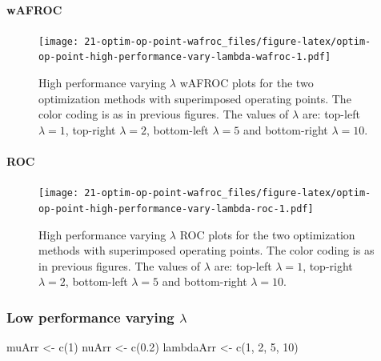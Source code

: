 \documentclass[
]{book}
\newenvironment{Shaded}{\begin{snugshade}}{\end{snugshade}}
\newcommand{\DecValTok}[1]{\textcolor[rgb]{0.00,0.00,0.81}{#1}}
\newcommand{\FloatTok}[1]{\textcolor[rgb]{0.00,0.00,0.81}{#1}}
\newcommand{\FunctionTok}[1]{\textcolor[rgb]{0.00,0.00,0.00}{#1}}
\newcommand{\NormalTok}[1]{#1}
\newcommand{\OtherTok}[1]{\textcolor[rgb]{0.56,0.35,0.01}{#1}}
\begin{document}
\hypertarget{wafroc-7}{%
\paragraph{wAFROC}\label{wafroc-7}}

\begin{figure}
\centering
\texttt{[image: 21-optim-op-point-wafroc\_files/figure-latex/optim-op-point-high-performance-vary-lambda-wafroc-1.pdf]}
\caption{\label{fig:optim-op-point-high-performance-vary-lambda-wafroc}High performance varying \(\lambda\) wAFROC plots for the two optimization methods with superimposed operating points. The color coding is as in previous figures. The values of \(\lambda\) are: top-left \(\lambda = 1\), top-right \(\lambda = 2\), bottom-left \(\lambda = 5\) and bottom-right \(\lambda = 10\).}
\end{figure}

\hypertarget{roc-7}{%
\paragraph{ROC}\label{roc-7}}

\begin{figure}
\centering
\texttt{[image: 21-optim-op-point-wafroc\_files/figure-latex/optim-op-point-high-performance-vary-lambda-roc-1.pdf]}
\caption{\label{fig:optim-op-point-high-performance-vary-lambda-roc}High performance varying \(\lambda\) ROC plots for the two optimization methods with superimposed operating points. The color coding is as in previous figures. The values of \(\lambda\) are: top-left \(\lambda = 1\), top-right \(\lambda = 2\), bottom-left \(\lambda = 5\) and bottom-right \(\lambda = 10\).}
\end{figure}

\hypertarget{optim-op-point-low-performance-vary-lambda}{%
\subsubsection{\texorpdfstring{Low performance varying \(\lambda\)}{Low performance varying \textbackslash lambda}}\label{optim-op-point-low-performance-vary-lambda}}

\begin{Shaded}
\begin{Highlighting}[]
\NormalTok{muArr }\OtherTok{\textless{}{-}} \FunctionTok{c}\NormalTok{(}\DecValTok{1}\NormalTok{)}
\NormalTok{nuArr }\OtherTok{\textless{}{-}} \FunctionTok{c}\NormalTok{(}\FloatTok{0.2}\NormalTok{)}
\NormalTok{lambdaArr }\OtherTok{\textless{}{-}} \FunctionTok{c}\NormalTok{(}\DecValTok{1}\NormalTok{, }\DecValTok{2}\NormalTok{, }\DecValTok{5}\NormalTok{, }\DecValTok{10}\NormalTok{)}
\end{Highlighting}
\end{Shaded}
\end{document}
